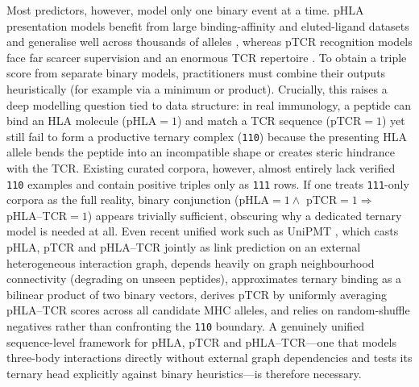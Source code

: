 \documentclass[webpdf,modern,large,namedate]{oup-authoring-template}
\theoremstyle{thmstyleone}
\theoremstyle{thmstyletwo}
\theoremstyle{thmstylethree}
\newcommand{\PH}{pHLA}
\newcommand{\PT}{pTCR}
\newcommand{\PHT}{pHLA--TCR}
\begin{document}
Most predictors, however, model only one binary event at a time. \PH{}
presentation models benefit from large binding-affinity and eluted-ligand
datasets and generalise well across thousands of alleles
\citep{reynisson2020netmhcpan, odonnell2020mhcflurry}, whereas \PT{}
recognition models face far scarcer supervision and an enormous TCR repertoire
\citep{springer2020ergo, lu2021pmtnet, weber2021titan}. To obtain a triple
score from separate binary models, practitioners must combine their outputs
heuristically (for example via a minimum or product). Crucially, this raises a
deep modelling question tied to data structure: in real immunology, a peptide
can bind an HLA molecule (\PH{}$=1$) and match a TCR sequence (\PT{}$=1$) yet
still fail to form a productive ternary complex (\texttt{110}) because the
presenting HLA allele bends the peptide into an incompatible shape or creates
steric hindrance with the TCR. Existing curated corpora, however, almost
entirely lack verified \texttt{110} examples and contain positive triples only
as \texttt{111} rows. If one treats \texttt{111}-only corpora as the full
reality, binary conjunction (\PH{}$=1 \land$ \PT{}$=1 \Rightarrow$ \PHT{}$=1$)
appears trivially sufficient, obscuring why a dedicated ternary model is needed
at all. Even recent unified work such as UniPMT \citep{zhao2025unipmt}, which
casts \PH{}, \PT{} and \PHT{} jointly as link prediction on an external
heterogeneous interaction graph, depends heavily on graph neighbourhood
connectivity (degrading on unseen peptides), approximates ternary binding as a
bilinear product of two binary vectors, derives \PT{} by uniformly averaging
\PHT{} scores across all candidate MHC alleles, and relies on random-shuffle
negatives rather than confronting the \texttt{110} boundary. A genuinely
unified sequence-level framework for \PH{}, \PT{} and \PHT{}---one that models
three-body interactions directly without external graph dependencies and tests
its ternary head explicitly against binary heuristics---is therefore necessary.
\end{document}
